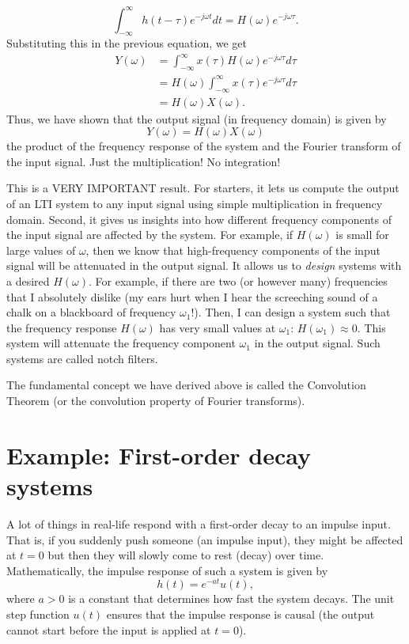 \[
\int_{-\infty}^{\infty} h(t - \tau) e^{-j \omega t} dt = H(\omega) e^{-j \omega \tau}.
\]
Substituting this in the previous equation, we get
\[
\begin{aligned}
Y(\omega) &= \int_{-\infty}^{\infty} x(\tau) H(\omega) e^{-j \omega \tau} d\tau \\
&= H(\omega) \int_{-\infty}^{\infty} x(\tau) e^{-j \omega \tau} d\tau \\
&= H(\omega) X(\omega).
\end{aligned}
\]
Thus, we have shown that the output signal (in frequency domain) is given by
\[
Y(\omega) = H(\omega) X(\omega)
\]
the product of the frequency response of the system and the Fourier transform of the input signal. Just the multiplication! No integration!

This is a VERY IMPORTANT result. For starters, it lets us compute the output of an LTI system to any input signal using simple multiplication in frequency domain. Second, it gives us insights into how different frequency components of the input signal are affected by the system. For example, if $H(\omega)$ is small for large values of $\omega$, then we know that high-frequency components of the input signal will be attenuated in the output signal. It allows us to \emph{design} systems with a desired $H(\omega)$. For example, if there are two (or however many) frequencies that I absolutely dislike (my ears hurt when I hear the screeching sound of a chalk on a blackboard of frequency $\omega_1$!). Then, I can design a system such that the frequency response $H(\omega)$ has very small values at $\omega_1$: $H(\omega_1) \approx 0$. This system will attenuate the frequency component $\omega_1$ in the output signal. Such systems are called notch filters. 

The fundamental concept we have derived above is called the Convolution Theorem (or the convolution property of Fourier transforms).

\section{Example: First-order decay systems}
A lot of things in real-life respond with a first-order decay to an impulse input. That is, if you suddenly push someone (an impulse input), they might be affected at $t=0$ but then they will slowly come to rest (decay) over time. Mathematically, the impulse response of such a system is given by
\[
h(t) = e^{-a t} u(t),
\]
where $a > 0$ is a constant that determines how fast the system decays. The unit step function $u(t)$ ensures that the impulse response is causal (the output cannot start before the input is applied at $t=0$). 


